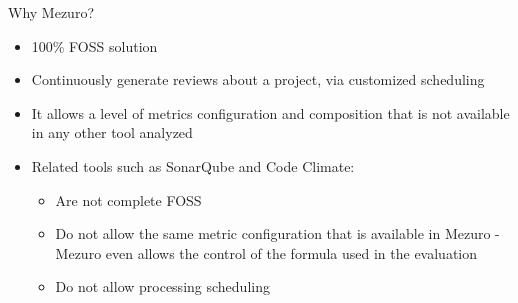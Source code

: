 \begin{block}{Why Mezuro?}

    \begin{itemize}
        \item 100\% FOSS solution

        \item Continuously generate reviews about a project, via customized
            scheduling

        \item It allows a level of metrics configuration and composition that
            is not available in any other tool analyzed

        \item Related tools such as SonarQube and Code Climate:
            \begin{itemize}
                \item Are not complete FOSS
                \item Do not allow the same metric configuration that is
                    available in Mezuro - Mezuro even allows the control of
                    the formula used in the evaluation
                \item Do not allow processing scheduling
            \end{itemize}

    \end{itemize}
\end{block}
